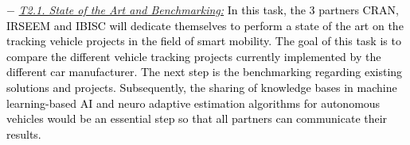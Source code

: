 \documentclass[a4paper,11pt]{article}
\begin{document}
\begin{itemize}[leftmargin=.2in,noitemsep,nolistsep]
\begin{tcolorbox}[breakable, enhanced,  colback=blue!2!white,
title = \bf Contributors$-$Deadlines$-$Objectives, coltitle= black, colbacktitle=blue!40!white, halign title=center]
\end{tcolorbox}

%
\subitem$-$ \underline{\it T2.1. State of the Art and Benchmarking:} %
 \textcolor{black}{In this task, the 3 partners CRAN, IRSEEM and IBISC will dedicate themselves to  perform a state of the art on the tracking vehicle projects in the field of smart mobility. The goal of this task is to compare the different vehicle tracking projects currently implemented by the different car manufacturer. The next step is the benchmarking regarding existing solutions and projects. Subsequently, the sharing of knowledge bases in machine learning-based AI and neuro adaptive estimation algorithms for autonomous vehicles would be an essential step so that all partners can communicate their results. %
 }   
 

\end{itemize}
\end{document}
